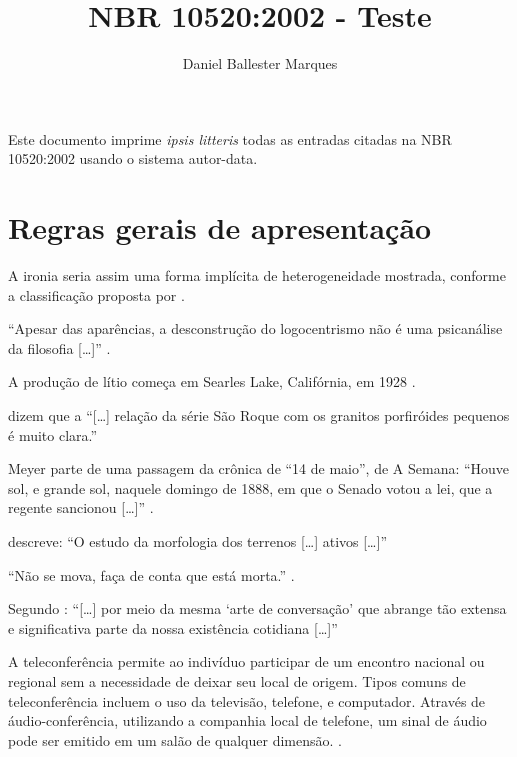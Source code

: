 \documentclass[a4paper]{article}
\title{NBR 10520:2002 - Teste}
\author{Daniel Ballester Marques}
\begin{document}
\color{red!50}

\maketitle

Este documento imprime \textit{ipsis litteris} todas as entradas citadas na
NBR 10520:2002 usando o sistema autor-data.

\tableofcontents

\clearpage

\setcounter{section}{5}

\section{Regras gerais de apresentação}

A ironia seria assim uma forma implícita de heterogeneidade mostrada, conforme
a classificação proposta por \textcite{authier1982}.

\enquote{Apesar das aparências, a desconstrução do logocentrismo não é uma
psicanálise da filosofia [\ldots]} \cite[293]{derrida1967}.

A produção de lítio começa em Searles Lake, Califórnia, em 1928
\cite[513]{mumford1949}.

\textcite[146]{oliveira1943} dizem que a \enquote{[\ldots] relação da série
São Roque com os granitos porfiróides pequenos é muito clara.}

Meyer parte de uma passagem da crônica de \enquote{14 de maio}, de A Semana:
\enquote{Houve sol, e grande sol, naquele domingo de 1888, em que o Senado
votou a lei, que a regente sancionou [\ldots]} \cite[v. 3, p. 583]{assis1994}.

\textcite[35]{barbour1971} descreve: \enquote{O estudo da morfologia dos
terrenos [\ldots] ativos [\ldots]}

\enquote{Não se mova, faça de conta que está morta.} \cite[72]{clarac1985}.

Segundo \textcite[27]{sa1995}: \enquote{[\ldots] por meio da mesma \enquote{arte de
conversação} que abrange tão extensa e significativa parte da nossa existência
cotidiana [\ldots]}

A teleconferência permite ao indivíduo participar de um encontro nacional ou
regional sem a necessidade de deixar seu local de origem. Tipos comuns de
teleconferência incluem o uso da televisão, telefone, e computador. Através de
áudio-conferência, utilizando a companhia local de telefone, um sinal de áudio
pode ser emitido em um salão de qualquer dimensão. \cite[181]{nichols1993}.
\end{document}

